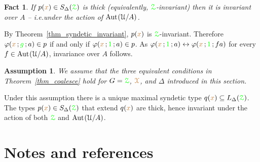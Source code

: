 \documentclass[10pt,openany]{amsproc}
\makeatletter
\newcommand{\mylabel}[1]{{\ssf{#1}}\hfill}
\renewenvironment{itemize}
  {\begin{list}{}{%
   \setlength{\parskip}{0mm}
   \setlength{\topsep}{.2\baselineskip}
   \setlength{\rightmargin}{0mm}
   \setlength{\listparindent}{0mm}
   \setlength{\itemindent}{0mm}
   \setlength{\labelwidth}{2ex}
   \setlength{\itemsep}{.1\baselineskip}
   \setlength{\parsep}{0mm}
   \setlength{\partopsep}{0mm}
   \setlength{\labelsep}{1ex}
   \setlength{\leftmargin}{\labelwidth+\labelsep}
   \let\makelabel\mylabel
   }}
   {\vspace*{-.3\baselineskip}\end{list}}
\def\Aut{{\rm Aut\kern.15ex}}
\def\iff{\leftrightarrow}
\def\D{\EuScript D}
\def\X{\EuScript X}
\def\Z{\EuScript Z}
\def\U{\EuScript U}
\def\G{\EuScript G}
\def\phi{\varphi}
\def\ssf#1{\textsf{\small #1}}
\newcounter{thm}
\theoremstyle{mio}
\newtheorem{fact}[thm]{Fact}\tcolorboxenvironment{fact}{mythm}
\newtheorem{assumption}[thm]{Assumption}\tcolorboxenvironment{assumption}{mythm}
\providecommand{\proofNameStyle}{\bfseries}
\renewenvironment{proof}[1][\proofname]{\par
  \pushQED{\qed}%
  \normalfont%
  \trivlist
  \item[\hskip\labelsep
        \proofNameStyle
    #1\@addpunct{.}]\ignorespaces
}{%
  \popQED\endtrivlist\@endpefalse
}
\def\mr{\color{brown}}
\def\gr{\color{green}}
\def\mrD{{\mr\D}}
\def\mrG{{\mr\G}}
\def\mrX{{\mr\X}}
\def\grG{{\gr\G}}
\def\grZ{{\gr\Z}}
\makeatother
\begin{document}
\begin{fact}
  If $p({\mr x})\in S_\Delta(\grZ)$ is thick (equivalently, $\grZ$-invariant) then it is invariant over $A$ -- i.e.\@ under the action of $\Aut(\U/A)$.
\end{fact}

\begin{proof}
  By Theorem~\ref{thm_syndetic_invariant}, $p({\mr x})$ is  $\grZ$-invariant.
  Therefore $\phi({\mr x}\,;{\gr g}\,;a)\in p$ if and only if  $\phi({\mr x}\,;{\gr 1}\,;a)\in p$.
  As $\phi({\mr x}\,;{\gr 1}\,;a)\iff\phi({\mr x}\,;{\gr 1}\,;fa)$ for every $f\in\Aut(\U/A)$, invariance over $A$ follows.
\end{proof}






\begin{assumption}
  We assume that the three equivalent conditions in Theorem~\ref{thm_coalesce} hold for $G=\grZ$, $\mrX$, and $\Delta$ introduced in this section.
\end{assumption}

Under this assumption there is a unique maximal syndetic type $q({\mr x})\subseteq L_\Delta(\grZ)$.
The types $p({\mr x})\in S_\Delta(\grZ)$ that extend $q({\mr x})$ are thick, hence invariant under the action of both $\grZ$ and $\Aut(\U/A)$.



\section{Notes and references}

  \begin{biblist}[]\normalsize
  \end{biblist}

  
\end{document}
